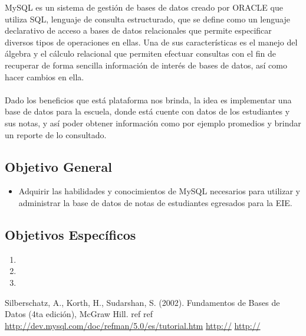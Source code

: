 \documentclass[12pt,journal,compsoc]{article}
\begin{document}
MySQL es un sistema de gestión de bases de datos creado por ORACLE que utiliza SQL, lenguaje de consulta estructurado, que se define como un lenguaje declarativo de acceso a bases de datos relacionales que permite especificar diversos tipos de operaciones en ellas. Una de sus características es el manejo del álgebra y el cálculo relacional que permiten efectuar consultas con el fin de recuperar de forma sencilla información de interés de bases de datos, así como hacer cambios en ella.\\\\
Dado los beneficios que está plataforma nos brinda, la idea es implementar una base de datos para la escuela, donde está cuente con datos de los estudiantes y sus notas, y así poder obtener información como por ejemplo promedios y brindar un reporte de lo consultado.
\subsection*{Objetivo General}
\begin{itemize}
\item Adquirir las habilidades y conocimientos de MySQL necesarios para utilizar y administrar la base de datos de notas de estudiantes egresados para la EIE.
\end{itemize}
\subsection*{Objetivos Específicos}
\begin{enumerate}
\item 
\item 
\item 
\end{enumerate}
\begin{thebibliography}{6}
 Silberschatz, A., Korth, H., Sudarshan, S. (2002). Fundamentos de Bases de Datos (4ta edición), McGraw Hill.
ref
ref
\bibitem{}\url{http://dev.mysql.com/doc/refman/5.0/es/tutorial.htm}
\url{http://}
\bibitem{}\url{http://}
\end{thebibliography}
\end{document}
